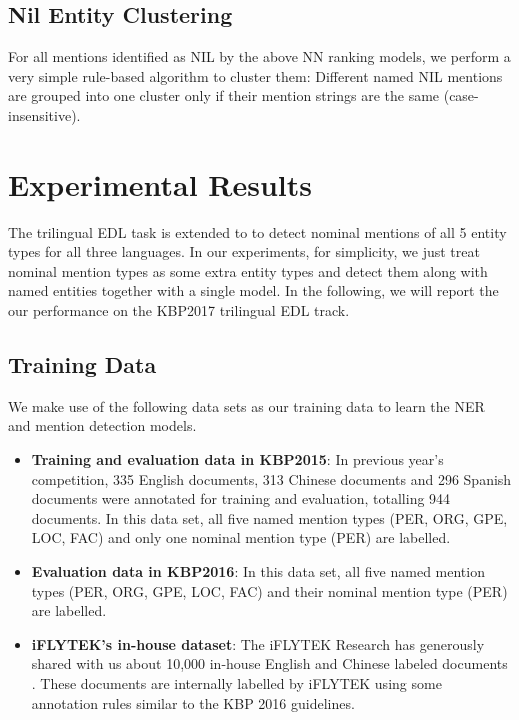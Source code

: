 \documentclass[11pt]{article}
\begin{document}
\subsection{Nil Entity Clustering}

For all mentions identified as NIL by the above NN ranking models, we perform a very simple
rule-based algorithm to cluster them: Different named NIL mentions are grouped into one cluster
only if their mention strings are the same (case-insensitive).

\section{Experimental Results}

The trilingual EDL task is extended to to detect nominal mentions of all 5 entity types for all three languages. In our experiments, for simplicity, we just treat nominal mention types as some extra entity types and detect them along with named entities together with a single model.  
In the following, we will report the our performance on the KBP2017  trilingual EDL track. 

\subsection{Training Data}

We make use of the following data sets as our training data to learn the NER and mention detection models. 

\begin{itemize}
	\item \textbf{Training and evaluation data in KBP2015}: In previous year's competition, 335 English documents, 313 Chinese documents and 296 Spanish documents were annotated for training and evaluation, totalling 944 documents. In this data set, all five named mention types (PER, ORG, GPE, LOC, FAC) and only one nominal mention type (PER) are labelled. 
	
	\item \textbf{Evaluation data in KBP2016}: In this data set, all five named mention types (PER, ORG, GPE, LOC, FAC) and their nominal mention type (PER) are labelled. 
	
	\item \textbf{iFLYTEK's in-house dataset}: The iFLYTEK Research has generously shared with us about 10,000 in-house English and Chinese labeled documents \cite{kbp2016iflytek}.  These documents are internally labelled by iFLYTEK using some annotation rules similar to the KBP 2016 guidelines.
	
\end{itemize}
\end{document}
